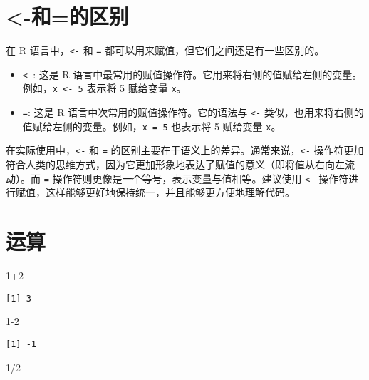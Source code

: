 \documentclass[
  letterpaper,
  DIV=11,
  numbers=noendperiod]{scrreprt}
\newenvironment{Shaded}{\begin{snugshade}}{\end{snugshade}}
\newcommand{\DecValTok}[1]{\textcolor[rgb]{0.68,0.00,0.00}{#1}}
\newcommand{\SpecialCharTok}[1]{\textcolor[rgb]{0.37,0.37,0.37}{#1}}
\providecommand{\tightlist}{%
  \setlength{\itemsep}{0pt}\setlength{\parskip}{0pt}}\usepackage{longtable,booktabs,array}
\begin{document}
\section{\textless-和=的区别}\label{ux548cux7684ux533aux522b}

在 R 语言中，\texttt{\textless{}-} 和 \texttt{=}
都可以用来赋值，但它们之间还是有一些区别的。

\begin{itemize}
\tightlist
\item
  \texttt{\textless{}-}: 这是 R
  语言中最常用的赋值操作符。它用来将右侧的值赋给左侧的变量。例如，\texttt{x\ \textless{}-\ 5}
  表示将 5 赋给变量 \texttt{x}。
\item
  \texttt{=}: 这是 R 语言中次常用的赋值操作符。它的语法与
  \texttt{\textless{}-}
  类似，也用来将右侧的值赋给左侧的变量。例如，\texttt{x\ =\ 5} 也表示将
  5 赋给变量 \texttt{x}。
\end{itemize}

在实际使用中，\texttt{\textless{}-} 和 \texttt{=}
的区别主要在于语义上的差异。通常来说，\texttt{\textless{}-}
操作符更加符合人类的思维方式，因为它更加形象地表达了赋值的意义（即将值从右向左流动）。而
\texttt{=} 操作符则更像是一个等号，表示变量与值相等。建议使用
\texttt{\textless{}-}
操作符进行赋值，这样能够更好地保持统一，并且能够更方便地理解代码。

\section{运算}\label{ux8fd0ux7b97}

\begin{Shaded}
\begin{Highlighting}[]
\DecValTok{1}\SpecialCharTok{+}\DecValTok{2}
\end{Highlighting}
\end{Shaded}

\begin{verbatim}
[1] 3
\end{verbatim}

\begin{Shaded}
\begin{Highlighting}[]
\DecValTok{1{-}2}
\end{Highlighting}
\end{Shaded}

\begin{verbatim}
[1] -1
\end{verbatim}

\begin{Shaded}
\begin{Highlighting}[]
\DecValTok{1}\SpecialCharTok{/}\DecValTok{2}
\end{Highlighting}
\end{Shaded}
\end{document}
